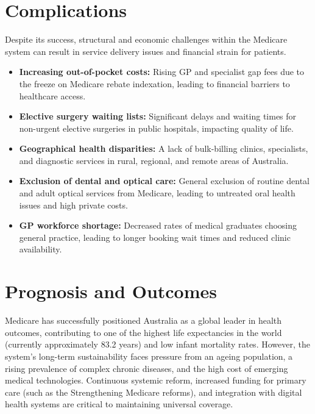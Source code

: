 \section*{Complications}
Despite its success, structural and economic challenges within the Medicare system can result in service delivery issues and financial strain for patients.
\begin{itemize}
    \item \textbf{Increasing out-of-pocket costs:} Rising GP and specialist gap fees due to the freeze on Medicare rebate indexation, leading to financial barriers to healthcare access.
    \item \textbf{Elective surgery waiting lists:} Significant delays and waiting times for non-urgent elective surgeries in public hospitals, impacting quality of life.
    \item \textbf{Geographical health disparities:} A lack of bulk-billing clinics, specialists, and diagnostic services in rural, regional, and remote areas of Australia.
    \item \textbf{Exclusion of dental and optical care:} General exclusion of routine dental and adult optical services from Medicare, leading to untreated oral health issues and high private costs.
    \item \textbf{GP workforce shortage:} Decreased rates of medical graduates choosing general practice, leading to longer booking wait times and reduced clinic availability.
\end{itemize}

\section*{Prognosis and Outcomes}
Medicare has successfully positioned Australia as a global leader in health outcomes, contributing to one of the highest life expectancies in the world (currently approximately 83.2 years) and low infant mortality rates. However, the system's long-term sustainability faces pressure from an ageing population, a rising prevalence of complex chronic diseases, and the high cost of emerging medical technologies. Continuous systemic reform, increased funding for primary care (such as the Strengthening Medicare reforms), and integration with digital health systems are critical to maintaining universal coverage.

